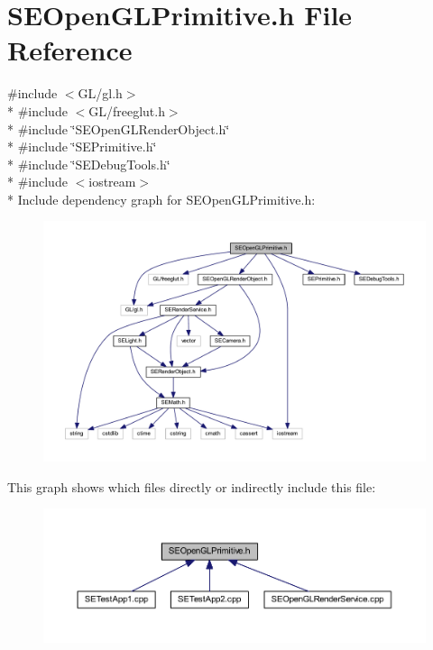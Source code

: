 \section{S\+E\+Open\+G\+L\+Primitive.\+h File Reference}
\label{_s_e_open_g_l_primitive_8h}
{\ttfamily \#include $<$G\+L/gl.\+h$>$}\\*
{\ttfamily \#include $<$G\+L/freeglut.\+h$>$}\\*
{\ttfamily \#include \char`\"{}S\+E\+Open\+G\+L\+Render\+Object.\+h\char`\"{}}\\*
{\ttfamily \#include \char`\"{}S\+E\+Primitive.\+h\char`\"{}}\\*
{\ttfamily \#include \char`\"{}S\+E\+Debug\+Tools.\+h\char`\"{}}\\*
{\ttfamily \#include $<$iostream$>$}\\*
Include dependency graph for S\+E\+Open\+G\+L\+Primitive.\+h\+:
\nopagebreak
\begin{figure}[H]
\begin{center}
\leavevmode
\includegraphics[width=350pt]{_s_e_open_g_l_primitive_8h__incl}
\end{center}
\end{figure}
This graph shows which files directly or indirectly include this file\+:
\nopagebreak
\begin{figure}[H]
\begin{center}
\leavevmode
\includegraphics[width=350pt]{_s_e_open_g_l_primitive_8h__dep__incl}
\end{center}
\end{figure}
